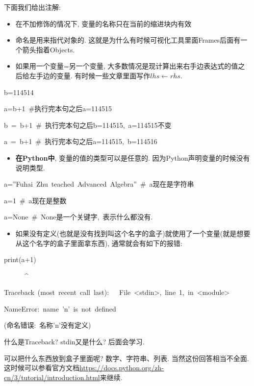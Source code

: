 下面我们给出注解:
\begin{itemize}
\item 在不加修饰的情况下, 变量的名称只在当前的缩进块内有效
\item 命名是用来指代对象的. 这就是为什么有时候可视化工具里面Frames后面有一个箭头指着Objects.
\item 如果用一个变量=另一个变量, 大多数情况是现计算出来右手边表达式的值之后给左手边的变量. 有时候一些文章里面写作$lhs\leftarrow rhs$.
\end{itemize}
\begin{lyxcode}
b=114514

a=b+1~\#执行完本句之后a=114515

b~=~b+1~\#~执行完本句之后b=114515,~a=114515不变

a~=~b+1~\#~执行完本句之后a=114515,~b=114516
\end{lyxcode}
\begin{itemize}
\item \textbf{在Python中}, 变量的值的类型可以是任意的. 因为Python声明变量的时候没有说明类型.
\end{itemize}
\begin{lyxcode}
a=''Fuhai~Zhu~teached~Advanced~Algebra''~\#~a现在是字符串

a=1~\#~a现在是整数

a=None~\#~None是一个关键字,~表示什么都没有.
\end{lyxcode}
\begin{itemize}
\item 如果没有定义(也就是没有找到叫这个名字的盒子)就使用了一个变量(就是想要从这个名字的盒子里面拿东西), 通常就会有如下的报错:
\end{itemize}
\begin{lyxcode}
print(a+1)

~~~~~~\textasciicircum{}

Traceback~(most~recent~call~last):~~~File~\textquotedbl <stdin>\textquotedbl ,~line~1,~in~<module>~

NameError:~name~'n'~is~not~defined

(命名错误:~名称'n'没有定义)
\end{lyxcode}

\begin{bonus}
什么是Traceback? stdin又是什么? 后面会学习. 	
\end{bonus}
 

可以把什么东西放到盒子里面呢? 数字、字符串、列表. 当然这份回答相当不全面. 这时候可以参看官方文档\url{https://docs.python.org/zh-cn/3/tutorial/introduction.html}来继续.

